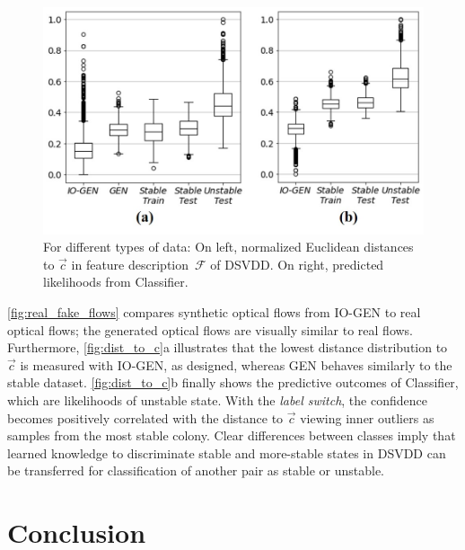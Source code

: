 \documentclass[letterpaper]{article} %
\let\orgautoref\autoref
\providecommand{\Autoref}
{\def\equationautorefname{Equation}%
\def\figureautorefname{Figure}%
\def\subfigureautorefname{Figure}%
\def\Itemautorefname{Item}%
\def\tableautorefname{Table}%
\def\exerciseautorefname{Exercise}%
\def\starexerciseautorefname{Exercise}%
\def\sectionautorefname{Section}%
\def\subsectionautorefname{Section}%
\def\subsubsectionautorefname{Section}%
\def\chapterautorefname{Section}%
\def\partautorefname{Part}%
\orgautoref}
\renewcommand{\autoref}
{\def\equationautorefname{Equation}%
\def\figureautorefname{Fig.}%
\def\subfigureautorefname{Fig.}%
\def\Itemautorefname{item}%
\def\tableautorefname{Table}%
\def\exerciseautorefname{Exercise}%
\def\starexerciseautorefname{Exercise}%
\def\sectionautorefname{Section}%
\def\subsectionautorefname{Section}%
\def\subsubsectionautorefname{Section}%
\def\chapterautorefname{Section}%
\def\partautorefname{Part}%
\orgautoref}
\begin{document}
\begin{figure}
\centering
\includegraphics[trim={0pt 30pt 0pt 0pt},clip,width=.98\columnwidth]{dist_to_c}
\caption{For different types of data:
On left, normalized Euclidean distances to $\vec{c}$
in feature description~$\mathcal{F}$ of DSVDD.
On right, predicted likelihoods from Classifier.
}
\label{fig:dist_to_c}
\end{figure}
\Autoref{fig:real_fake_flows} compares synthetic optical flows from
\mbox{IO-GEN} to real optical flows; the generated optical flows are
visually similar to real flows. Furthermore, \autoref{fig:dist_to_c}a
illustrates that the lowest distance distribution to $\vec{c}$ is
measured with \mbox{IO-GEN}, as designed, whereas GEN behaves similarly to the
stable dataset. \Autoref{fig:dist_to_c}b finally shows the predictive
outcomes of Classifier, which are likelihoods of unstable state. With
the \emph{label switch}, the confidence becomes positively correlated
with the distance to $\vec{c}$ viewing inner outliers as samples from
the most stable colony. Clear differences between classes imply that
learned knowledge to discriminate stable and more-stable states in DSVDD
can be transferred for classification of another pair as stable or
unstable.




\vspace{-3.55mm}
\section{Conclusion}
\label{sec:conclusion}
\end{document}
